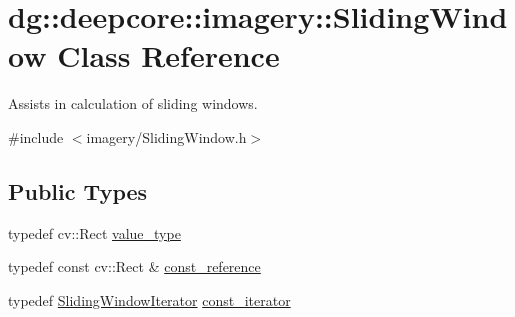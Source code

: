 \hypertarget{classdg_1_1deepcore_1_1imagery_1_1_sliding_window}{}\section{dg\+:\+:deepcore\+:\+:imagery\+:\+:Sliding\+Window Class Reference}
\label{classdg_1_1deepcore_1_1imagery_1_1_sliding_window}


Assists in calculation of sliding windows.  




{\ttfamily \#include $<$imagery/\+Sliding\+Window.\+h$>$}

\subsection*{Public Types}
\begin{DoxyCompactItemize}
\item 
typedef cv\+::\+Rect \hyperlink{classdg_1_1deepcore_1_1imagery_1_1_sliding_window_aa709c18e431e937e57b72a869e2bf272}{value\+\_\+type}
\item 
typedef const cv\+::\+Rect \& \hyperlink{classdg_1_1deepcore_1_1imagery_1_1_sliding_window_a73353ca1fb994a367f73d6d079b170e9}{const\+\_\+reference}
\item 
typedef \hyperlink{classdg_1_1deepcore_1_1imagery_1_1_sliding_window_iterator}{Sliding\+Window\+Iterator} \hyperlink{classdg_1_1deepcore_1_1imagery_1_1_sliding_window_aca1804ceef890966623a8acfcd01f2e9}{const\+\_\+iterator}
\end{DoxyCompactItemize}
